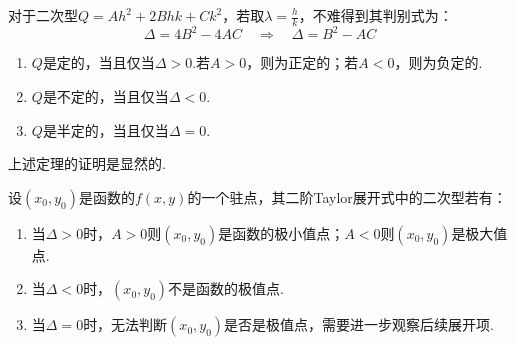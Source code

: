 对于二次型$Q = Ah^2 + 2Bhk + Ck^2$，若取$\lambda = \frac{h}{k}$，不难得到其判别式为：
\[\Delta = 4B^2 - 4AC \quad\Rightarrow\quad \Delta = B^2 - AC\]

\begin{theorem}
    \begin{enumerate}[circ]
        \item $Q$是定的，当且仅当$\Delta > 0$.若$A > 0$，则为正定的；若$A < 0$，则为负定的.
        \item $Q$是不定的，当且仅当$\Delta < 0$.
        \item $Q$是半定的，当且仅当$\Delta = 0$.
    \end{enumerate}
\end{theorem}
上述定理的证明是显然的.

\begin{theorem}
    设$(x_0,y_0)$是函数的$f(x,y)$的一个驻点，其二阶Taylor展开式中的二次型若有：
    \begin{enumerate}[circ]
        \item 当$\Delta > 0$时，$A>0$则$(x_0,y_0)$是函数的极小值点；$A<0$则$(x_0,y_0)$是极大值点.
        \item 当$\Delta < 0$时，$(x_0,y_0)$不是函数的极值点.
        \item 当$\Delta = 0$时，无法判断$(x_0,y_0)$是否是极值点，需要进一步观察后续展开项.
    \end{enumerate}
\end{theorem}

